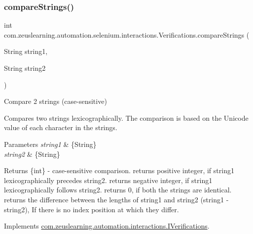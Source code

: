 \subsubsection{\texorpdfstring{compare\+Strings()}{compareStrings()}}
{\footnotesize\ttfamily int com.\+zeuslearning.\+automation.\+selenium.\+interactions.\+Verifications.\+compare\+Strings (\begin{DoxyParamCaption}\item[{String}]{string1,  }\item[{String}]{string2 }\end{DoxyParamCaption})\hspace{0.3cm}{\ttfamily [inline]}}

Compare 2 strings (case-\/sensitive)

Compares two strings lexicographically. The comparison is based on the Unicode value of each character in the strings. 


\begin{DoxyParams}{Parameters}
{\em string1} & \{String\} \\
\hline
{\em string2} & \{String\} \\
\hline
\end{DoxyParams}
\begin{DoxyReturn}{Returns}
\{int\} -\/ case-\/sensitive comparison. returns positive integer, if {\ttfamily string1} lexicographically precedes {\ttfamily string2}. returns negative integer, if {\ttfamily string1} lexicographically follows {\ttfamily string2}. returns 0, if both the strings are identical. returns the difference between the lengths of {\ttfamily string1} and {\ttfamily string2} ({\ttfamily string1} -\/ {\ttfamily string2}), If there is no index position at which they differ. 
\end{DoxyReturn}


Implements \hyperlink{interfacecom_1_1zeuslearning_1_1automation_1_1interactions_1_1IVerifications_ace567c4e2269a32d10805e3269679713}{com.\+zeuslearning.\+automation.\+interactions.\+I\+Verifications}.

\hypertarget{classcom_1_1zeuslearning_1_1automation_1_1selenium_1_1interactions_1_1Verifications_a23860edcf479a39582e0e0199bdac9c5}{}\label{classcom_1_1zeuslearning_1_1automation_1_1selenium_1_1interactions_1_1Verifications_a23860edcf479a39582e0e0199bdac9c5} 
